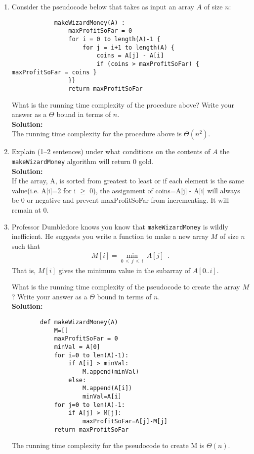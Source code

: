 \documentclass[12pt]{article}
\begin{document}
\begin{enumerate}
		\begin{enumerate}
		\item \label{stocks:a} Consider the pseudocode below that takes as input an array $A$ of size $n$:
		\begin{small}
			\begin{verbatim}
			makeWizardMoney(A) : 
				maxProfitSoFar = 0
				for i = 0 to length(A)-1 {
					for j = i+1 to length(A) {
						coins = A[j] - A[i]
						if (coins > maxProfitSoFar) { maxProfitSoFar = coins }
				}}
				return maxProfitSoFar
			\end{verbatim}
			\end{small}
		What is the running time complexity of the procedure above? Write your answer as a $\Theta$ bound in terms of $n$.\\
		{\bf{Solution:}}\\
			The running time complexity for the procedure above is $\Theta(n^2)$.\\

		\item \label{stocks:b} Explain (1--2 sentences) under what conditions on the contents of $A$ the {\tt makeWizardMoney} algorithm will return 0 gold.\\
		{\bf{Solution:}}\\
			If the array, A, is sorted from greatest to least or if each element is the same value(i.e. A[i]=2 for i $\geq$ 0), the
			assignment of coins=A[j] - A[i] will always be 0 or negative and prevent maxProfitSoFar from incrementing. It will remain at 0.\\
		
		\pagebreak

		\item \label{stocks:c} Professor Dumbledore knows you know that {\tt makeWizardMoney} is wildly inefficient. He suggests you write a function to make a new array $M$ of size $n$ such that
		\begin{align}
		M[i] = \min_{0\,\leq\, j\, \leq \,i} ~A[j] \nonumber \enspace .
		\end{align}
		That is, $M[i]$ gives the minimum value in the subarray of $A[0 .. i]$.

		What is the running time complexity of the pseudocode to create the array $M$? Write your answer as a $\Theta$ bound in terms of $n$.\\
		{\bf{Solution:}}
		\begin{small}
		\begin{verbatim}
		def makeWizardMoney(A)
			M=[]
			maxProfitSoFar = 0
			minVal = A[0]
			for i=0 to len(A)-1):
				if A[i] > minVal:
					M.append(minVal)
				else:
					M.append(A[i])
					minVal=A[i]
			for j=0 to len(A)-1:
				if A[j] > M[j]:
					maxProfitSoFar=A[j]-M[j]       
			return maxProfitSoFar
		\end{verbatim}
		\end{small}
			The running time complexity for the pseudocode to create M is $\Theta(n)$.\\			


\end{enumerate}
\end{enumerate}
\end{document}
